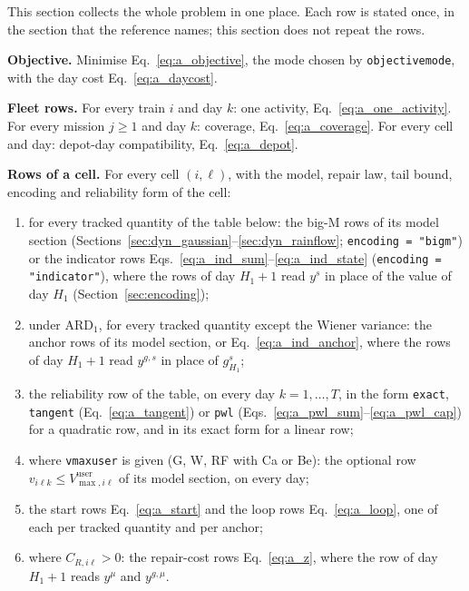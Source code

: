 \documentclass[11pt,a4paper]{article}
\theoremstyle{plain}
\theoremstyle{definition}
\newcommand{\ARDone}{\mathrm{ARD}_{1}}
\renewcommand{\_}{\textunderscore\allowbreak{}}
\begin{document}
This section collects the whole problem in one place. Each row is stated once, in the
section that the reference names; this section does not repeat the rows.

\textbf{Objective.} Minimise Eq.~\eqref{eq:a_objective}, the mode chosen by
\texttt{objective\_mode}, with the day cost Eq.~\eqref{eq:a_daycost}.

\textbf{Fleet rows.} For every train $i$ and day $k$: one activity,
Eq.~\eqref{eq:a_one_activity}. For every mission $j \geq 1$ and day $k$: coverage,
Eq.~\eqref{eq:a_coverage}. For every cell and day: depot-day compatibility,
Eq.~\eqref{eq:a_depot}.

\textbf{Rows of a cell.} For every cell $(i,\ell)$, with the model, repair law,
tail bound, encoding and reliability form of the cell:
\begin{enumerate}[nosep,leftmargin=2em]
  \item for every tracked quantity of the table below: the big-M rows of its model
        section (Sections~\ref{sec:dyn_gaussian}--\ref{sec:dyn_rainflow};
        \texttt{encoding = "bigm"}) or the indicator rows
        Eqs.~\eqref{eq:a_ind_sum}--\eqref{eq:a_ind_state} (\texttt{encoding = "indicator"}),
        where the rows of day $H_1 + 1$ read $y^s$ in place of the value of day $H_1$
        (Section~\ref{sec:encoding});
  \item under $\ARDone$, for every tracked quantity except the Wiener variance: the
        anchor rows of its model section, or Eq.~\eqref{eq:a_ind_anchor}, where the rows
        of day $H_1 + 1$ read $y^{g,s}$ in place of $g^s_{H_1}$;
  \item the reliability row of the table, on every day $k = 1, \ldots, T$, in the form
        \texttt{exact}, \texttt{tangent} (Eq.~\eqref{eq:a_tangent}) or \texttt{pwl}
        (Eqs.~\eqref{eq:a_pwl_sum}--\eqref{eq:a_pwl_cap}) for a quadratic row, and in
        its exact form for a linear row;
  \item where \texttt{v\_max\_user} is given (G, W, RF with Ca or Be): the optional row
        $v_{i\ell k} \leq V^{\mathrm{user}}_{\max,i\ell}$ of its model section, on every day;
  \item the start rows Eq.~\eqref{eq:a_start} and the loop rows Eq.~\eqref{eq:a_loop},
        one of each per tracked quantity and per anchor;
  \item where $C_{R,i\ell} > 0$: the repair-cost rows Eq.~\eqref{eq:a_z}, where the row
        of day $H_1 + 1$ reads $y^{\mu}$ and $y^{g,\mu}$.
\end{enumerate}
\end{document}
